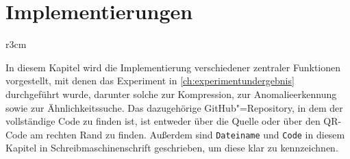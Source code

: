 \chapter{Implementierungen}\label{ch:implementierung}
\begin{wrapfigure}{r}{3cm}
    \centering
\end{wrapfigure}

In diesem Kapitel wird die Implementierung verschiedener zentraler Funktionen vorgestellt, mit denen das Experiment in \autoref{ch:experimentundergebnis} durchgeführt wurde, darunter solche zur Kompression, zur Anomalieerkennung sowie zur Ähnlichkeitssuche. Das dazugehörige GitHub"=Repository, in dem der vollständige Code zu finden ist, ist entweder über die Quelle \cite{meinGithubCode} oder über den QR-Code am rechten Rand zu finden. Außerdem sind \texttt{Dateiname} und \texttt{Code} in diesem Kapitel in Schreibmaschinenschrift geschrieben, um diese klar zu kennzeichnen. 



